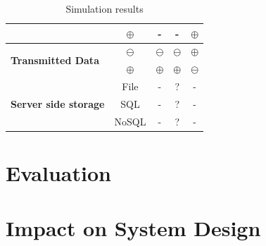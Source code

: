 \begin{table}[h]
\begin{tabular}{l|c|c|c|c}
                                                         & $\oplus$                                                           & -                                       & -                                                 & $\oplus$                                       \\ \hline
\multirow{2}{*}{\textbf{Transmitted Data}}               & $\ominus$                                                           & $\ominus$                                       & $\ominus$                                                 & $\oplus$                                       \\ \cline{2-5} 
                                                         & $\oplus$                                                           & $\oplus$                                       & $\oplus$                                                 & $\ominus$                                       \\ \hline
\multirow{3}{*}{\textbf{Server side storage}}            & File                                                        & -                                       & ?                                                 & -                                       \\ \cline{2-5} 
                                                         & SQL                                                         & -                                       & ?                                                 & -                                       \\ \cline{2-5} 
                                                         & NoSQL                                                       & -                                       & ?                                                 & -                                       \\ \hline
\end{tabular}
\caption{Simulation results}
\label{tab:SimulationResults}
\end{table}

\section{Evaluation}

\section{Impact on System Design}